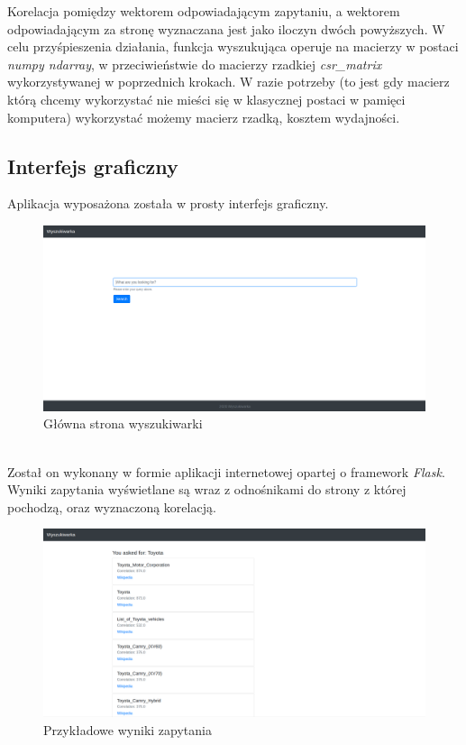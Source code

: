 \documentclass{article}
\begin{document}
        Korelacja pomiędzy wektorem odpowiadającym zapytaniu, a wektorem odpowiadającym za stronę wyznaczana jest jako iloczyn dwóch powyższych. W celu przyśpieszenia działania, funkcja wyszukująca operuje na macierzy w postaci \textit{numpy ndarray}, w przeciwieństwie do macierzy rzadkiej \textit{csr\_matrix} wykorzystywanej w poprzednich krokach. W razie potrzeby (to jest gdy macierz którą chcemy wykorzystać nie mieści się w klasycznej postaci w pamięci komputera) wykorzystać możemy macierz rzadką, kosztem wydajności. 
        
        \subsection{Interfejs graficzny}
        Aplikacja wyposażona została w prosty interfejs graficzny.
        \begin{figure}[h!]
            \centering
            \includegraphics[width=14cm]{lab6/img/front_index.png}
            \caption{Główna strona wyszukiwarki}
        \end{figure}\\
        Został on wykonany w formie aplikacji internetowej opartej o framework \textit{Flask}. \\
        Wyniki zapytania wyświetlane są wraz z odnośnikami do strony z której pochodzą, oraz wyznaczoną korelacją. 
        \begin{figure}[h!]
            \centering
            \includegraphics[width=14cm]{lab6/img/front_result1.png}
            \caption{Przykładowe wyniki zapytania}
        \end{figure}\\
        \FloatBarrier
\end{document}
